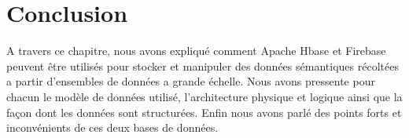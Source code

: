 \section{Conclusion}
A travers ce chapitre, nous avons expliqué comment Apache Hbase et Firebase peuvent être utilisés pour stocker et manipuler des données sémantiques récoltées a partir d'ensembles de données a grande échelle. Nous avons pressente pour chacun le modèle de
données utilisé, l'architecture physique et logique ainsi que la façon dont les données sont structurées. Enfin nous avons parlé des points forts et inconvénients de ces deux bases de données.